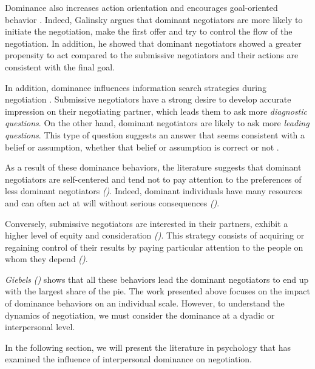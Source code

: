 \documentclass[10pt, a4paper, twocolumn]{article} %
\begin{document}
			Dominance also increases action orientation and encourages goal-oriented behavior \cite{van2006power}. Indeed, Galinsky  \cite{Galinsky 2003power} argues that dominant negotiators are more likely to initiate the negotiation, make the first offer and try to control the flow of the negotiation. 
			In addition, he showed that dominant negotiators showed a greater propensity to act compared to the submissive negotiators and their actions are consistent with the final goal.
			
			In addition, dominance influences information search strategies during negotiation \cite{de2004influence}. Submissive negotiators have a strong desire to develop accurate impression on their negotiating partner, which leads them to ask more \emph{diagnostic questions}.
			On the other hand, dominant negotiators are likely to ask more \emph{leading questions}. This type of question suggests an answer that seems consistent with a belief or assumption, whether that belief or assumption is correct or not \cite{galinsky2003power}.
			
			As a result of these dominance behaviors, the literature suggests that dominant negotiators are self-centered and tend not to pay attention to the preferences of less dominant negotiators \emph{(\cite{fiske1993controlling, de1995impact})}. Indeed, dominant individuals have many resources and can often act at will without serious consequences \emph{(\cite{van2006power})}. 
			
			Conversely, submissive negotiators are interested in their partners, exhibit a higher level of equity and consideration \emph{(\cite{de1995impact})}. This strategy consists of acquiring or regaining control of their results by paying particular attention to the people on whom they depend \emph{(\cite{fiske1993controlling})}.
			
			\emph{Giebels} \emph{(\cite{giebels2000interdependence})} shows that all these behaviors lead the dominant negotiators to end up with the largest share of the pie.
			The work presented above focuses on the impact of dominance behaviors on an individual scale. However, to understand the dynamics of negotiation, we must consider the dominance at a dyadic or interpersonal level. 
			
			In the following section, we will present the literature in psychology that has examined the influence of interpersonal dominance on negotiation. 
\end{document}
